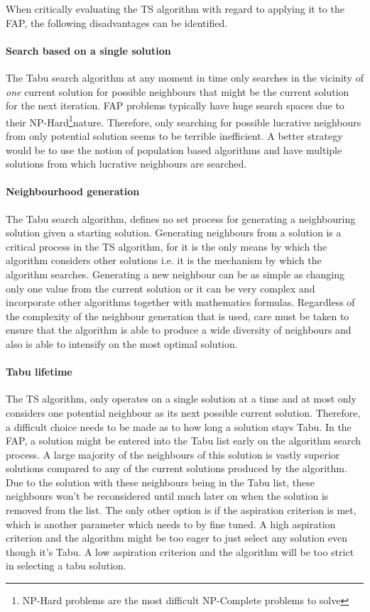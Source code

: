 When critically evaluating the TS algorithm with regard to applying it to the FAP, the following disadvantages can be identified.
\paragraph{Search based on a single solution}
The Tabu search algorithm at any moment in time only searches in the vicinity of \emph{one} current solution for possible neighbours that might be the current solution for the next iteration. FAP problems typically have huge search spaces due to their NP-Hard\footnote{NP-Hard problems are the most difficult NP-Complete problems to solve\cite{AIModernApproach}}nature. Therefore, only searching for possible lucrative neighbours from only potential solution seems to be terrible inefficient. A better strategy would be to use the notion of population based algorithms and have multiple solutions from which lucrative neighbours are searched.
\paragraph{Neighbourhood generation}
The Tabu search algorithm, defines no set process for generating a neighbouring solution given a starting solution. Generating neighbours from a solution is a critical process in the TS algorithm, for it is the only means by which the algorithm considers other solutions i.e. it is the mechanism by which the algorithm searches. Generating a new neighbour can be as simple as changing only one value from the current solution or it can be very complex and incorporate other algorithms together with mathematics formulas. Regardless of the complexity of the neighbour generation that is used, care must be taken to ensure that the algorithm is able to produce a wide diversity of neighbours and also is able to intensify on the most optimal solution.
\paragraph{Tabu lifetime}
The TS algorithm, only operates on a single solution at a time and at most only considers one potential neighbour as its next possible current solution. Therefore, a difficult choice needs to be made as to how long a solution stays Tabu. In the FAP, a solution might be entered into the Tabu list early on the algorithm search process. A large majority of the neighbours of this solution is vastly superior solutions compared to any of the current solutions produced by the algorithm. Due to the solution with these neighbours being in the Tabu list, these neighbours won't be reconsidered until much later on when the solution is removed from the list. The only other option is if the aspiration criterion is met, which is another parameter which needs to by fine tuned. A high aspiration criterion and the algorithm might be too eager to just select any solution even though it's Tabu. A low aspiration criterion and the algorithm will be too strict in selecting a tabu solution.

